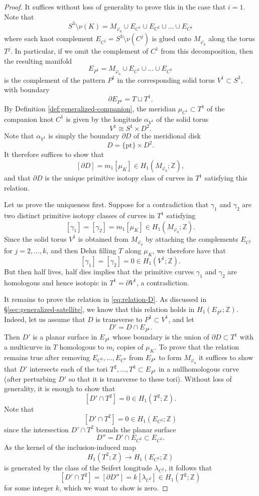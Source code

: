 \documentclass[11pt]{amsart}
\numberwithin{equation}{section}
\numberwithin{theorem}{section}
\theoremstyle{definition}
\newcommand{\Z}{\mathbb{Z}}
\newcommand{\pt}{\mathrm{pt}}
\begin{document}
\begin{proof} 
It suffices without loss of generality to prove this in the case that $i=1$. Note that \[S^3\setminus \nu(K)=M_{\varphi_0}\cup E_{C^1}\cup E_{C^2}\cup \dots \cup E_{C^k} \] where each knot complement $E_{C^j}=S^3\setminus \nu(C^j)$ is glued onto $M_{\varphi_0}$ along the torus $T^j$. In particular, if we omit the complement of $C^1$ from this decomposition, then the resulting manifold \[E_{P^1}=M_{\varphi_0} \cup E_{C^2}\cup \dots \cup E_{C^k}\] is the complement of the pattern $P^1$ in the corresponding solid torus $V^1\subset S^3$, with boundary \[\partial E_{P^1} = T \sqcup T^1.\] By Definition \ref{def:generalized-companion}, the meridian $\mu_{C^1}\subset T^1$ of the companion knot $C^1$ is given by the longitude $\alpha_{V^1}$ of the solid torus \[V^1\cong S^1\times D^2.\] Note that $\alpha_{V^1}$ is simply the boundary $\partial D$ of the meridional disk \[D = \{\pt\}\times D^2.\] It therefore suffices to show that \begin{equation}\label{eq:relation-D}[\partial D] = m_1[\mu_K]\in H_1(M_{\varphi_0};\Z),\end{equation} and that $\partial D$ is the unique primitive isotopy class of curves in $T^1$ satisfying this relation.

Let us prove the uniqueness first. Suppose for a contradiction that $\gamma_1$ and $\gamma_2$ are two distinct primitive isotopy classes of curves in $T^1$ satisfying \[[\gamma_1]=[\gamma_2] = m_1[\mu_K]\in H_1(M_{\varphi_0};\Z).\] Since the solid torus $V^1$ is obtained from $M_{\varphi_0}$ by attaching the complements $E_{C^j}$ for $j=2,\dots,k$, and then Dehn filling $T$ along $\mu_K$, we therefore have that  \[[\gamma_1]=[\gamma_2] = 0 \in H_1(V^1;\Z).\] But then half lives, half dies implies that the primitive curves $\gamma_1$ and $\gamma_2$ are homologous and hence isotopic in $T^1 = \partial V^1$, a contradiction.

It remains to prove the relation in \eqref{eq:relation-D}. As discussed in \S\ref{sec:generalized-satellite}, we know that this relation holds in $H_1(E_{P^1};\Z)$. Indeed, let us assume that $D$ is transverse to $P^1\subset V^1$, and let \[D' = D\cap E_{P^1}.\] Then $D'$ is a planar surface in $E_{P^1}$ whose boundary is the union of $\partial D\subset T^1$ with a multicurve in $T$ homologous to $m_i$ copies of $\mu_K$. To prove that the relation remains true after removing  $E_{C^2},\dots,E_{C^k}$ from $E_{P^1}$ to form $M_{\varphi_0}$ it suffices to show that $D'$ intersects each of the tori $T^2,\dots,T^k\subset E_{P^1}$ in a nullhomologous curve (after perturbing $D'$ so that it is transverse to these tori). Without loss of generality, it is enough to show that \[[D'\cap T^2] = 0\in H_1(T^2;\Z).\] Note that \[[D'\cap T^2] = 0 \in H_1(E_{C^2};\Z)\] since the intersection $D'\cap T^2$ bounds the planar surface \[D''=D'\cap E_{C^2} \subset E_{C^2}.\] As the kernel of the inclusion-induced map \[H_1(T^2;\Z)\to H_1(E_{C^2};\Z)\] is generated by the class of the Seifert longitude $\lambda_{C^2}$, it follows that \[[D'\cap T^2] = [\partial D'']=k[\lambda_{C^2}]\in H_1(T^2;\Z)\] for some integer $k$, which we want to show is zero. 


\end{proof}
\end{document}
